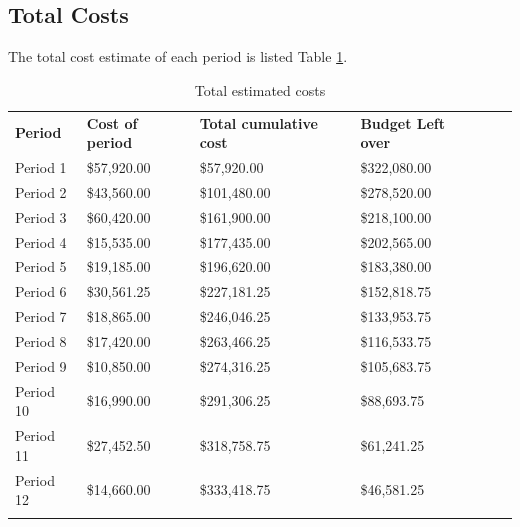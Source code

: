 \subsection{Total Costs}

The total cost estimate of each period is listed Table \ref{tab:totalcosts}.

\begin{table}[]
\centering
\caption{Total estimated costs}
\label{tab:totalcosts}
\begin{tabular}{llllll}
\textbf{Period} & \textbf{Cost of period} & \textbf{Total cumulative cost} & \textbf{Budget Left over}           &  &  \\
Period 1        & \$57,920.00             & \$57,920.00                    & \$322,080.00                        &  &  \\
Period 2        & \$43,560.00             & \$101,480.00                   & \$278,520.00                        &  &  \\
Period 3        & \$60,420.00             & \$161,900.00                   & \$218,100.00                        &  &  \\
Period 4        & \$15,535.00             & \$177,435.00                   & \$202,565.00                        &  &  \\
Period 5        & \$19,185.00             & \$196,620.00                   & \$183,380.00                        &  &  \\
Period 6        & \$30,561.25             & \$227,181.25                   & \$152,818.75                        &  &  \\
Period 7        & \$18,865.00             & \$246,046.25                   & \$133,953.75                        &  &  \\
Period 8        & \$17,420.00             & \$263,466.25                   & \$116,533.75                        &  &  \\
Period 9        & \$10,850.00             & \$274,316.25                   & \$105,683.75                        &  &  \\
Period 10       & \$16,990.00             & \$291,306.25                   & \$88,693.75                         &  &  \\
Period 11       & \$27,452.50             & \$318,758.75                   & \$61,241.25                         &  &  \\
Period 12       & \$14,660.00             & \$333,418.75                   & \cellcolor[HTML]{9AFF99}\$46,581.25 &  &  \\
                &                         &                                &                                     &  & 
\end{tabular}
\end{table}

